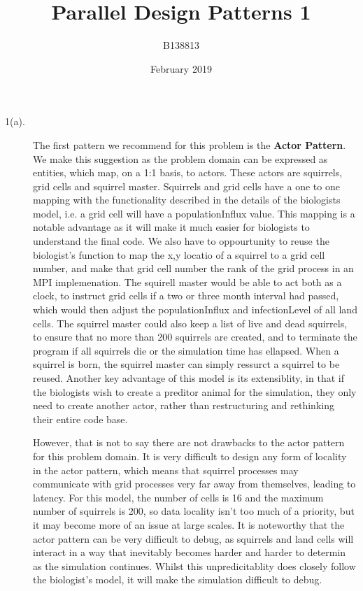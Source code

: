 \documentclass{article}
\title{Parallel Design Patterns 1}
\author{B138813}
\date{February 2019}
\begin{document}
\maketitle
\begin{description}
    \item [1(a).]

    The first pattern we recommend for this problem is the \textbf{Actor Pattern}. We make this suggestion as the problem domain can be expressed as entities, which map, on a 1:1 basis, to actors. These actors are squirrels, grid cells and squirrel master. Squirrels and grid cells have a one to one mapping with the functionality described in the details of the biologists model, i.e. a grid cell will have a populationInflux value. This mapping is a notable advantage as it will make it much easier for biologists to understand the final code. We also have to oppourtunity to reuse the biologist's function to map the x,y locatio of a squirrel to a grid cell number, and make that grid cell number the rank of the grid process in an MPI implemenation. The squirell master would be able to act both as a clock, to instruct grid cells if a two or three month interval had passed, which would then adjust the populationInflux and infectionLevel of all land cells. The squirrel master could also keep a list of live and dead squirrels, to ensure that no more than 200 squirrels are created, and to terminate the program if all squirrels die or the simulation time has ellapsed. When a squirrel is born, the squirrel master can simply ressurct a squirrel to be reused. Another key advantage of this model is its extensiblity, in that if the biologists wish to create a preditor animal for the simulation, they only need to create another actor, rather than restructuring and rethinking their entire code base.

    However, that is not to say there are not drawbacks to the actor pattern for this problem domain. It is very difficult to design any form of locality in the actor pattern, which means that squirrel processes may communicate with grid processes very far away from themselves, leading to latency. For this model, the number of cells is 16 and the maximum number of squirrels is 200, so data locality isn't too much of a priority, but it may become more of an issue at large scales. It is noteworthy that the actor pattern can be very difficult to debug, as squirrels and land cells will interact in a way that inevitably becomes harder and harder to determin as the simulation continues. Whilst this unpredicitablity does closely follow the biologist's model, it will make the simulation difficult to debug.



\end{description}
\end{document}
